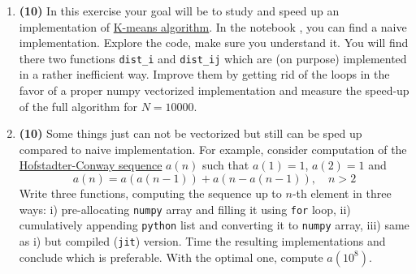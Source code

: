 \begin{enumerate}
\begin{comment}
\item \textbf{(5)} Implement the function \lstinline{sum_array(A)} which takes a 2D numpy array \lstinline{A} as input and returns the sum of the array's elements. Consider doing it in 3 ways: (i) looping through the array explicitely, (ii) doing the jit version of (i), and (iii) using NumPy's built-in functionality. Time these three approaches for large enough arrays.
\end{comment}

\item \textbf{(10)} In this exercise your goal will be to study and speed up an implementation of \href{https://en.wikipedia.org/wiki/K-means_clustering}{K-means algorithm}. In the notebook , you can find a naive implementation. Explore the code, make sure you understand it. You will find there two functions \texttt{dist\_i} and \texttt{dist\_ij} which are (on purpose) implemented in a rather inefficient way. Improve them by getting rid of the loops in the favor of a proper numpy vectorized implementation and measure the speed-up of the full algorithm for $N=10000$.

\item \textbf{(10)} Some things just can not be vectorized but still can be sped up compared to naive implementation. For example, consider computation of the \href{https://mathworld.wolfram.com/Hofstadter-Conway10000-DollarSequence.html}{Hofstadter-Conway sequence} $a(n)$ such that $a(1)=1$, $a(2)=1$ and
\begin{equation}
a(n) = a(a(n-1)) + a(n-a(n-1)),\quad n > 2
\end{equation}
Write three functions, computing the sequence up to $n$-th element in three ways: i) pre-allocating \texttt{numpy} array and filling it using \texttt{for} loop, ii) cumulatively appending \texttt{python} list and converting it to \texttt{numpy} array, iii) same as i)  but compiled (\texttt{jit}) version. Time the resulting implementations and conclude which is preferable. With the optimal one, compute $a(10^8)$.


\end{enumerate}
